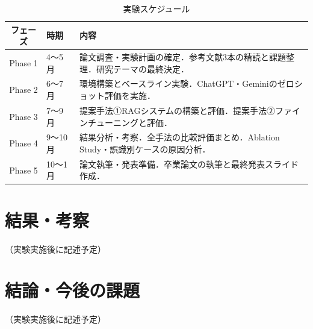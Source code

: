 \documentclass{ltjsarticle}
\begin{document}
\begin{table}[h]
\centering
\caption{実験スケジュール}
\label{tab:schedule}
\begin{tabular}{cll}
\toprule
フェーズ & 時期 & 内容 \\
\midrule
Phase 1 & 4〜5月  & 論文調査・実験計画の確定．参考文献3本の精読と課題整理．研究テーマの最終決定． \\
Phase 2 & 6〜7月  & 環境構築とベースライン実験．ChatGPT・Geminiのゼロショット評価を実施． \\
Phase 3 & 7〜9月  & 提案手法①RAGシステムの構築と評価．提案手法②ファインチューニングと評価． \\
Phase 4 & 9〜10月 & 結果分析・考察．全手法の比較評価まとめ．Ablation Study・誤識別ケースの原因分析． \\
Phase 5 & 10〜1月 & 論文執筆・発表準備．卒業論文の執筆と最終発表スライド作成． \\
\bottomrule
\end{tabular}
\end{table}

\newpage

\section{結果・考察}\label{sec4}

（実験実施後に記述予定）

\newpage

\section{結論・今後の課題}\label{sec5}

（実験実施後に記述予定）

\newpage

\nocite{*}


\end{document}

